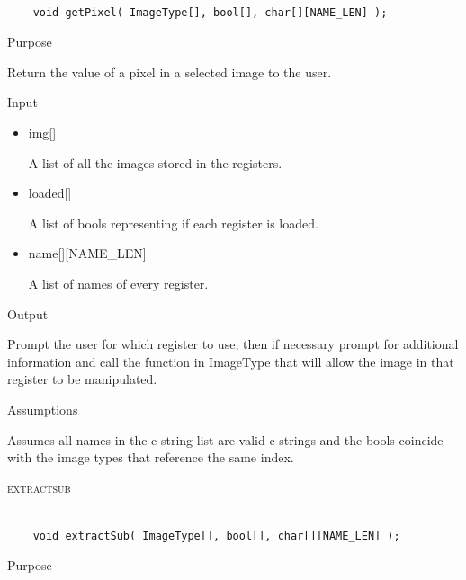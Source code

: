 \documentclass[pdftex, 11pt]{article}
\begin{document}
\begin{description}
		\begin{lstlisting}

	void getPixel( ImageType[], bool[], char[][NAME_LEN] );
		\end{lstlisting}

		\begin{description}
			\item{Purpose}

				Return the value of a pixel in a selected image to the user.

			\item{Input}

				\begin{itemize}

					\item{img[]}

						A list of all the images stored in the registers.

					\item{loaded[]}

						A list of bools representing if each register is loaded.

					\item{name[][NAME\_LEN]}

						A list of names of every register.

				\end{itemize}

			\item{Output}

				Prompt the user for which register to use, then if necessary
				prompt for additional information and call the function
				in ImageType that will allow the image in that register to
				be manipulated.

			\item{Assumptions}

				Assumes all names in the c string list are valid c
				strings and the bools coincide with the image types that
				reference the same index.

		\end{description}



	\item{\textsc{extractsub}}

		\begin{lstlisting}

	void extractSub( ImageType[], bool[], char[][NAME_LEN] );
		\end{lstlisting}

		\begin{description}
			\item{Purpose}


\end{description}
\end{description}
\end{document}
